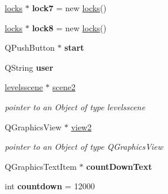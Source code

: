 \begin{DoxyCompactItemize}
\item 
\hypertarget{classgame1scene_a783433107de1418ee1ca5c82a2ba2155}{\hyperlink{classlocks}{locks} $\ast$ {\bfseries lock7} = new \hyperlink{classlocks}{locks}()}\label{classgame1scene_a783433107de1418ee1ca5c82a2ba2155}

\item 
\hypertarget{classgame1scene_a71c9197fc37bdbfa4c84a4896ff8fb1a}{\hyperlink{classlocks}{locks} $\ast$ {\bfseries lock8} = new \hyperlink{classlocks}{locks}()}\label{classgame1scene_a71c9197fc37bdbfa4c84a4896ff8fb1a}

\item 
\hypertarget{classgame1scene_a35dc8ff5e5eaf7fff1a49d192d67cf43}{Q\-Push\-Button $\ast$ {\bfseries start}}\label{classgame1scene_a35dc8ff5e5eaf7fff1a49d192d67cf43}

\item 
\hypertarget{classgame1scene_ac80d9732ed62e8a1453be6206e49b625}{Q\-String {\bfseries user}}\label{classgame1scene_ac80d9732ed62e8a1453be6206e49b625}

\item 
\hypertarget{classgame1scene_a117a936c1be44112e4c71a481121ecbb}{\hyperlink{classlevelsscene}{levelsscene} $\ast$ \hyperlink{classgame1scene_a117a936c1be44112e4c71a481121ecbb}{scene2}}\label{classgame1scene_a117a936c1be44112e4c71a481121ecbb}

\begin{DoxyCompactList}\small\item\em pointer to an Object of type levelsscene \end{DoxyCompactList}\item 
\hypertarget{classgame1scene_a5acd13b09ab8a8e73154e292633bbef3}{Q\-Graphics\-View $\ast$ \hyperlink{classgame1scene_a5acd13b09ab8a8e73154e292633bbef3}{view2}}\label{classgame1scene_a5acd13b09ab8a8e73154e292633bbef3}

\begin{DoxyCompactList}\small\item\em pointer to an Object of type Q\-Graphics\-View \end{DoxyCompactList}\item 
\hypertarget{classgame1scene_a9322202cbff7ba00ec16fa0163476238}{Q\-Graphics\-Text\-Item $\ast$ {\bfseries count\-Down\-Text}}\label{classgame1scene_a9322202cbff7ba00ec16fa0163476238}

\item 
\hypertarget{classgame1scene_abb3228cd05022e3f7ef04e3dee6d6910}{int {\bfseries countdown} = 12000}\label{classgame1scene_abb3228cd05022e3f7ef04e3dee6d6910}


\end{DoxyCompactItemize}
